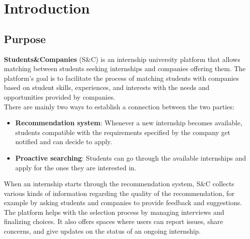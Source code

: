 \documentclass[11pt,twoside]{article}
\begin{document}
\newpage

\tableofcontents

\newpage

\section{Introduction}

\subsection{Purpose}
\textbf{Students\&Companies} (S\&C) is an internship university platform that allows matching between students seeking internships and companies offering them. The platform's goal is to facilitate the process of matching students with companies based on student skills, experiences, and interests with the needs and opportunities provided by companies.\\
There are mainly two ways to establish a connection between the two parties: 
\begin{itemize}
	\item \textbf{Recommendation system}: Whenever a new internship becomes available, students compatible with the requirements specified by the company get notified and can decide to apply.
	\item \textbf{Proactive searching}: Students can go through the available internships and apply for the ones they are interested in.
\end{itemize}
When an internship starts through the recommendation system, S\&C collects various kinds of information regarding the quality of the recommendation, for example by asking students and companies to provide feedback and suggestions. \\
The platform helps with the selection process by managing interviews and finalizing choices. It also offers spaces where users can report issues, share concerns, and give updates on the status of an ongoing internship.
\end{document}
